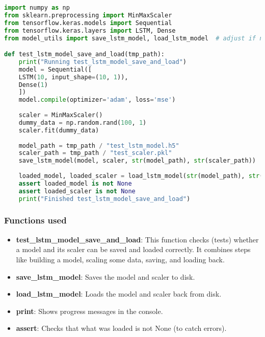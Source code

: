 \begin{lstlisting}[language=Python,caption={Test LSTM File }, label={LSTMTesting}]
import numpy as np
from sklearn.preprocessing import MinMaxScaler
from tensorflow.keras.models import Sequential
from tensorflow.keras.layers import LSTM, Dense
from model_utils import save_lstm_model, load_lstm_model  # adjust if needed

def test_lstm_model_save_and_load(tmp_path):
	print("Running test_lstm_model_save_and_load")
	model = Sequential([
	LSTM(10, input_shape=(10, 1)),
	Dense(1)
	])
	model.compile(optimizer='adam', loss='mse')
	
	scaler = MinMaxScaler()
	dummy_data = np.random.rand(100, 1)
	scaler.fit(dummy_data)
	
	model_path = tmp_path / "test_lstm_model.h5"
	scaler_path = tmp_path / "test_scaler.pkl"
	save_lstm_model(model, scaler, str(model_path), str(scaler_path))
	
	loaded_model, loaded_scaler = load_lstm_model(str(model_path), str(scaler_path))
	assert loaded_model is not None
	assert loaded_scaler is not None
	print("Finished test_lstm_model_save_and_load")

\end{lstlisting}

\subsubsection{Functions used}
\begin{itemize}
	\item \textbf{test\_lstm\_model\_save\_and\_load}: This function checks (tests) whether a model and its scaler can be saved and loaded correctly. It combines steps like building a model, scaling some data, saving, and loading back.
	\item \textbf{save\_lstm\_model}: Saves the model and scaler to disk.
	\item \textbf{load\_lstm\_model}: Loads the model and scaler back from disk.
	\item \textbf{print}: Shows progress messages in the console.
	\item \textbf{assert}: Checks that what was loaded is not None (to catch errors).
\end{itemize}

